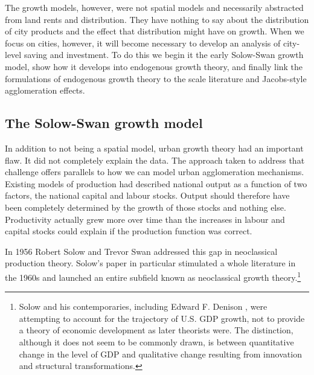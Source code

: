 The growth models, however, were not spatial models and necessarily abstracted from land rents and distribution. They have nothing to say about the distribution of city products and the effect that distribution might have on growth. When we focus on cities, however, it will become necessary to develop an analysis of city-level saving and investment. To do this we begin it the early Solow-Swan growth model, show how it develops into endogenous growth theory, and finally link the formulations of endogenous growth theory to the scale literature and Jacobs-style agglomeration effects.


\subsection{The Solow-Swan growth model}

In addition to not being a spatial model, urban growth theory had an important flaw. It did not completely explain the data. The approach taken to address that challenge offers parallels to how we can model urban agglomeration mechanisms. Existing models of production had described national output as a function of two factors, the national capital and labour stocks. Output should therefore have been completely determined by the growth of those stocks and nothing else. Productivity actually grew more over time than the increases in labour and capital stocks could explain if the production function was correct.

In 1956 Robert Solow \cite{solowContributionTheoryEconomic1956} and Trevor Swan \cite{swanEconomicGrowthCapital1956}
addressed this gap in neoclassical production theory. Solow's paper in particular stimulated a whole literature in the 1960s and launched an entire subfield known as neoclassical growth theory.\footnote{Solow and his contemporaries, including Edward F. Denison \cite{denisonSourcesEconomicGrowth1962}, were attempting to account for the trajectory
of U.S. GDP growth, not to provide a theory of economic development as later theorists were. The distinction, although it does not seem to be commonly drawn, is between quantitative change in the level of GDP and qualitative change resulting from innovation and structural transformations.} %

